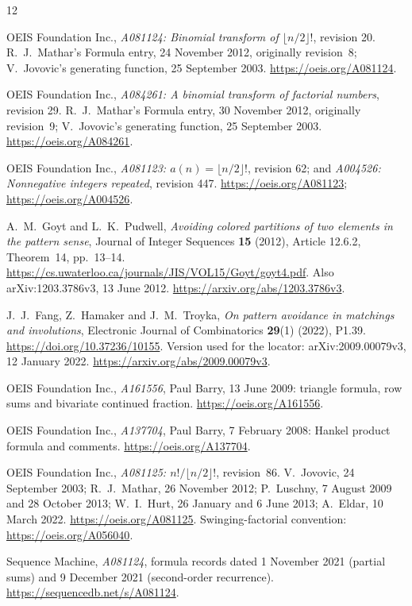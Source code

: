 \documentclass[11pt]{article}
\begin{document}
\begin{thebibliography}{12}
\raggedright
{}
OEIS Foundation Inc., \emph{A081124: Binomial transform of
$\lfloor n/2\rfloor!$}, revision 20.
R.~J.~Mathar's Formula entry, 24 November 2012, originally revision~8;
V.~Jovovic's generating function, 25 September 2003.
\url{https://oeis.org/A081124}.

OEIS Foundation Inc., \emph{A084261: A binomial transform of factorial
numbers}, revision 29.
R.~J.~Mathar's Formula entry, 30 November 2012, originally revision~9;
V.~Jovovic's generating function, 25 September 2003.
\url{https://oeis.org/A084261}.

OEIS Foundation Inc., \emph{A081123: $a(n)=\lfloor n/2\rfloor!$},
revision 62; and \emph{A004526: Nonnegative integers repeated},
revision 447. \url{https://oeis.org/A081123};
\url{https://oeis.org/A004526}.

A.~M.~Goyt and L.~K.~Pudwell,
\emph{Avoiding colored partitions of two elements in the pattern sense},
Journal of Integer Sequences \textbf{15} (2012), Article 12.6.2,
Theorem~14, pp.~13--14.
\url{https://cs.uwaterloo.ca/journals/JIS/VOL15/Goyt/goyt4.pdf}.
Also arXiv:1203.3786v3, 13 June 2012.
\url{https://arxiv.org/abs/1203.3786v3}.

J.~J.~Fang, Z.~Hamaker and J.~M.~Troyka,
\emph{On pattern avoidance in matchings and involutions},
Electronic Journal of Combinatorics \textbf{29}(1) (2022), P1.39.
\url{https://doi.org/10.37236/10155}.
Version used for the locator: arXiv:2009.00079v3, 12 January 2022.
\url{https://arxiv.org/abs/2009.00079v3}.

OEIS Foundation Inc., \emph{A161556}, Paul Barry, 13 June 2009:
triangle formula, row sums and bivariate continued fraction.
\url{https://oeis.org/A161556}.

OEIS Foundation Inc., \emph{A137704}, Paul Barry, 7 February 2008:
Hankel product formula and comments.
\url{https://oeis.org/A137704}.

OEIS Foundation Inc., \emph{A081125: $n!/\lfloor n/2\rfloor!$}, revision~86.
V.~Jovovic, 24 September 2003; R.~J.~Mathar, 26 November 2012;
P.~Luschny, 7 August 2009 and 28 October 2013;
W.~I.~Hurt, 26 January and 6 June 2013; A.~Eldar, 10 March 2022.
\url{https://oeis.org/A081125}.
Swinging-factorial convention: \url{https://oeis.org/A056040}.

Sequence Machine, \emph{A081124}, formula records dated
1 November 2021 (partial sums) and 9 December 2021 (second-order recurrence).
\url{https://sequencedb.net/s/A081124}.


\end{thebibliography}
\end{document}
